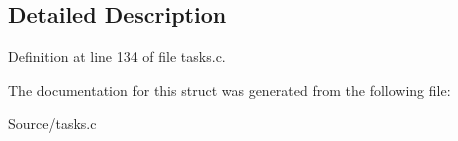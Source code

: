 \subsection{Detailed Description}


Definition at line 134 of file tasks.\+c.



The documentation for this struct was generated from the following file\+:\begin{DoxyCompactItemize}
\item 
Source/tasks.\+c\end{DoxyCompactItemize}
